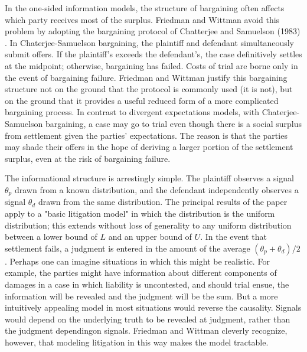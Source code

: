 \documentclass{article}
\begin{document}
In the one-sided information models, the structure of bargaining often affects which party receives most of the surplus. Friedman and Wittman avoid this problem by adopting the bargaining protocol of Chatterjee and Samuelson (1983) \cite{chatterjeesamuelson}. In Chaterjee-Samuelson bargaining, the plaintiff and defendant simultaneously submit offers. If the plaintiff's exceeds the defendant's, the case definitively settles at the midpoint; otherwise, bargaining has failed. Costs of trial are borne only in the event of bargaining failure.  Friedman and Wittman justify this bargaining structure not on the ground that the protocol is commonly used (it is not), but on the ground that it provides a useful reduced form of a more complicated bargaining process.  In contrast to divergent expectations models, with Chaterjee-Samuelson bargaining, a case may go to trial even though there is a social surplus from settlement given the parties' expectations. The reason is that the parties may shade their offers in the hope of deriving a larger portion of the settlement surplus, even at the risk of bargaining failure.

The informational structure is arrestingly simple. The plaintiff observes a signal $\theta_p$ drawn from a known distribution, and the defendant independently observes a signal $\theta_d$ drawn from the same distribution. The principal results of the paper apply to a "basic litigation model" in which the distribution is the uniform distribution; this extends without loss of generality to any uniform distribution between a lower bound of $L$ and an upper bound of $U$. In the event that settlement fails, a judgment is entered in the amount of the average $(\theta_p + \theta_d)/2$. Perhaps one can imagine situations in which this might be realistic. For example, the parties might have information about different components of damages in a case in which liability is uncontested, and should trial ensue, the information will be revealed and the judgment will be the sum. But a more intuitively appealing model in most situations would reverse the causality. Signals would depend on the underlying truth to be revealed at judgment, rather than the judgment dependingon signals. Friedman and Wittman cleverly recognize, however, that modeling litigation in this way makes the model tractable.
\end{document}
